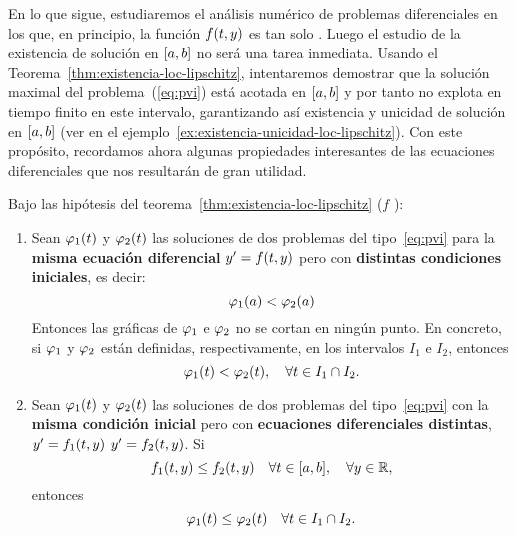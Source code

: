 En lo que sigue, estudiaremos el análisis numérico de problemas
diferenciales en los que, en principio, la función $f(\tt,y)$ es tan
solo \locLipschitz. Luego el estudio de la existencia de
solución en $[\ta,\tb]$ no será una tarea inmediata. Usando el
Teorema~\ref{thm:existencia-loc-lipschitz}, intentaremos demostrar que
la solución maximal del problema~(\ref{eq:pvi}) está acotada en
$[\ta,\tb]$ y por tanto no explota en tiempo finito en este intervalo,
garantizando así existencia y unicidad de solución en $[\ta,\tb]$ (ver
en el ejemplo~\ref{ex:existencia-unicidad-loc-lipschitz}). Con este
propósito, recordamos ahora algunas propiedades interesantes de las
ecuaciones diferenciales que nos resultarán de gran utilidad.

\begin{proposition}
\label{pro:propiedades-pvi}
  Bajo las hipótesis del teorema~\ref{thm:existencia-loc-lipschitz}
  ($f$ \locLipschitz):
  \begin{enumerate}
  \item Sean $\sol_1(\tt)$ y $\sol_2(\tt)$ las soluciones de dos
    problemas del tipo~\eqref{eq:pvi} para la \textbf{misma ecuación
    diferencial} $y'=f(\tt,y)$ pero con \textbf{distintas condiciones
    iniciales}, es decir:
    $$\sol_1(\ta)<\sol_2(\ta)$$
    Entonces las gráficas de $\sol_1$ e $\sol_2$ no se cortan en
    ningún punto. En concreto, si $\sol_1$ y $\sol_2$ están
    definidas, respectivamente, en los intervalos $I_1$ e $I_2$,
    entonces
    \begin{equation*}
      \sol_1(\tt) < \sol_2(\tt), \quad \forall \tt \in I_1
      \cap I_2.
    \end{equation*}

  \item Sean $\sol_1(\tt)$ y $\sol_2(\tt)$ las soluciones de dos
    problemas del tipo~\eqref{eq:pvi} con la \textbf{misma condición
      inicial} pero con \textbf{ecuaciones diferenciales distintas},
    $y'=f_1(\tt,y)$ $y'=f_2(\tt,y)$. Si
    $$
    f_1(\tt,y) \le f_2(\tt,y) \quad \forall \tt\in[\ta,\tb], \quad
    \forall y\in\Rset,
    $$
    entonces
    $$
    \sol_1(\tt)\le \sol_2(\tt) \quad \forall \tt \in
    I_1 \cap I_2.
    $$
  \end{enumerate}
\end{proposition}

